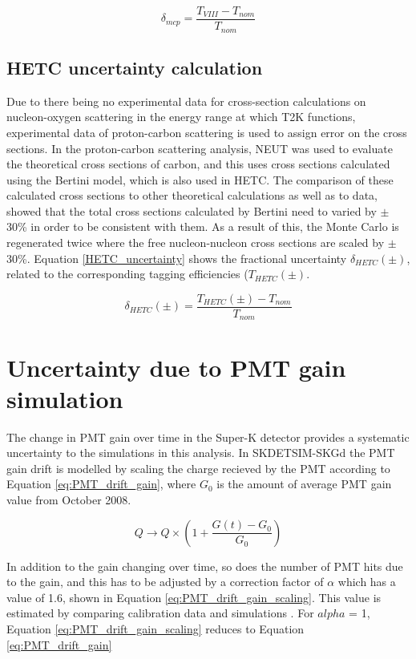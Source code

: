\begin{equation}
    \delta_{m c p}=\frac{T_{V I I I}-T_{n o m}}{T_{n o m}}
\label{MICAP_uncertainty}
\end{equation}

\subsection{HETC uncertainty calculation}

Due to there being no experimental data for cross-section calculations on nucleon-oxygen scattering in the energy range at which T2K functions, experimental data of proton-carbon scattering is used to assign error on the cross sections. In the proton-carbon scattering analysis, NEUT was used to evaluate the theoretical cross sections of carbon, and this uses cross sections calculated using the Bertini model, which is also used in HETC. The comparison of these calculated cross sections to other theoretical calculations as well as to data, showed that the total cross sections calculated by Bertini need to varied by $\pm$ 30\% in order to be consistent with them. As a result of this, the Monte Carlo is regenerated twice where the free nucleon-nucleon cross sections are scaled by $\pm$ 30\%. Equation \ref{HETC_uncertainty} shows the fractional uncertainty $\delta_{HETC}(\pm)$, related to the corresponding tagging efficiencies ($T_{HETC}(\pm)$. 

\begin{equation}
    \delta_{HETC }(\pm)=\frac{T_{HETC}(\pm)-T_{nom }}{T_{nom }}
\label{HETC_uncertainty}
\end{equation}

\section{Uncertainty due to PMT gain simulation}

The change in PMT gain over time in the Super-K detector provides a systematic uncertainty to the simulations in this analysis. In SKDETSIM-SKGd the PMT gain drift is modelled by scaling the charge recieved by the PMT according to Equation \ref{eq:PMT_drift_gain}, where $G_{0}$ is the amount of average PMT gain value from October 2008. 

\begin{equation}
    Q \longrightarrow Q \times\left(1+\frac{G(t)-G_0}{G_0}\right)
\label{eq:PMT_drift_gain}
\end{equation}

In addition to the gain changing over time, so does the number of PMT hits due to the gain, and this has to be adjusted by a correction factor of $\alpha$ which has a value of 1.6, shown in Equation \ref{eq:PMT_drift_gain_scaling}. This value is estimated by comparing calibration data and simulations \cite{linyan_thesis}. For $alpha$ = 1, Equation \ref{eq:PMT_drift_gain_scaling} reduces to Equation \ref{eq:PMT_drift_gain}



